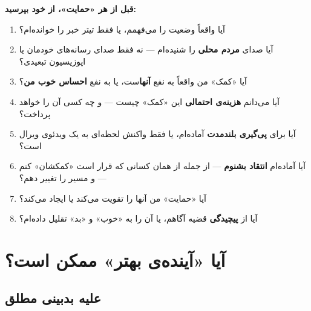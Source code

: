 \begin{tcolorbox}[wavebox, title={چک‌لیست خودانتقادی}]
\textbf{قبل از هر «حمایت»، از خود بپرسید:}

\begin{enumerate}
\item آیا واقعاً وضعیت را می‌فهمم، یا فقط تیتر خبر را خوانده‌ام؟
\item آیا صدای \textbf{مردم محلی} را شنیده‌ام — نه فقط صدای رسانه‌های
  خودمان یا اپوزیسیون تبعیدی؟
\item آیا «کمک» من واقعاً به نفع \textbf{آنها}ست، یا به نفع
  \textbf{احساس خوب من}؟
\item آیا می‌دانم \textbf{هزینه‌ی احتمالی} این «کمک» چیست — و چه کسی
  آن را خواهد پرداخت؟
\item آیا برای \textbf{پی‌گیری بلندمدت} آماده‌ام، یا فقط واکنش لحظه‌ای
  به یک ویدئوی ویرال است؟
\item آیا آماده‌ام \textbf{انتقاد بشنوم} — از جمله از همان کسانی که
  قرار است «کمکشان» کنم — و مسیر را تغییر دهم؟
\item آیا «حمایت» من  آنها را تقویت می‌کند یا
   ایجاد می‌کند؟
\item آیا از \textbf{پیچیدگی} قضیه آگاهم، یا آن را به «خوب» و «بد»
  تقلیل داده‌ام؟
\end{enumerate}
\end{tcolorbox}


\section{آیا «آینده‌ی بهتر» ممکن است؟}
\label{sec:ch17-better-future}

\subsection{علیه بدبینی مطلق}

